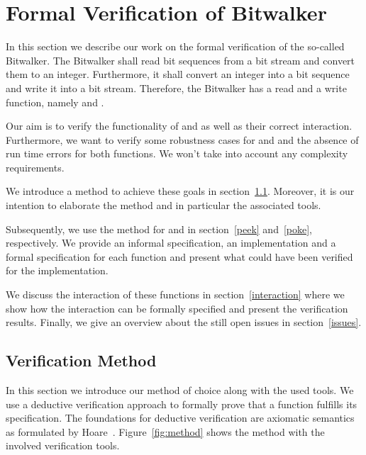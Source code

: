 
\section{Formal Verification of Bitwalker}
\label{sec:fokus}


In this section we describe our work on the formal verification
of the so-called Bitwalker.
The Bitwalker shall read bit sequences from a bit stream 
and convert them to an integer. Furthermore, it shall
convert an integer into a bit sequence and write it into a bit stream.
Therefore, the Bitwalker has a read and a write function, namely \peek and \poke.

Our aim is to verify the functionality of
\peek and \poke
as well as their correct interaction.
Furthermore, we want to verify some robustness cases for \peek and \poke
and the absence of run time errors for both functions.
We won't take into account any complexity requirements.

We introduce a method to achieve these goals in section~\ref{plan}.
Moreover, it is our intention
to elaborate the method and in particular the associated tools.

Subsequently, we use the method for \peek and \poke
in section~\ref{peek} and~\ref{poke}, respectively.
We provide an informal specification, an implementation and
a formal specification for each function and
present what could have been verified for the implementation.

We discuss the interaction of these functions in section~\ref{interaction}
where we show how the interaction can be formally specified 
and present the verification results.
Finally, we give an overview about the still open issues in section~\ref{issues}.


\subsection{Verification Method}
\label{plan}
\label{method}

In this section we introduce our method of choice along with the used tools.
We use a deductive verification approach to 
formally prove that a function fulfills its specification.
The foundations for deductive verification are axiomatic semantics as formulated
by Hoare~\cite{HoareCalculus}.
Figure~\ref{fig:method} shows the method with the involved verification tools.

